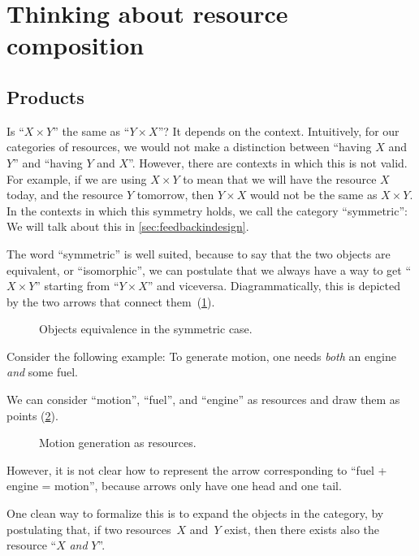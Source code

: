 \section{Thinking about resource composition}
\subsection{Products}
Is ``$X \times Y$'' the same as ``$Y \times X$''?
It depends on the context. Intuitively, for our categories of resources, we would not make a distinction
between ``having $X$ and $Y$'' and ``having $Y$ and $X$''.
However, there are contexts in which this is not valid. For example, if we are
using $X \times Y$ to mean that we will have the resource $X$ today, and the
resource $Y$ tomorrow, then $Y \times X$ would not be the same as $X \times Y$. In the contexts in which this symmetry holds, we call the category ``symmetric'': We will talk about this in \cref{sec:feedbackindesign}.

The word ``symmetric'' is well suited, because to say that the two objects are equivalent, or ``isomorphic'', we can postulate that we always have a way to get
``$X \times Y$'' starting from ``$Y \times X$'' and viceversa. Diagrammatically, this is depicted
by the two arrows that connect them~(\cref{fig:e17}).

\begin{figure}[h!]
    \centering
    \caption{Objects equivalence in the symmetric case. \label{fig:e17}}
\end{figure}

Consider the following example: To generate motion, one needs \emph{both} an engine \emph{and} some fuel.

We can consider ``motion'', ``fuel'', and ``engine'' as resources and draw them as points (\cref{fig:e11}).

\begin{figure}[h!]
    \centering
    \caption{Motion generation as resources. \label{fig:e11}}
\end{figure}

However, it is not clear how to represent the arrow corresponding to
``fuel + engine = motion'', because arrows only have one head and
one tail.

One clean way to formalize this is to expand the objects in the category,
by postulating that,
if two resources~$X$ and~$Y$ exist, then there exists also the
resource ``$X$ \emph{and} $Y$''.


